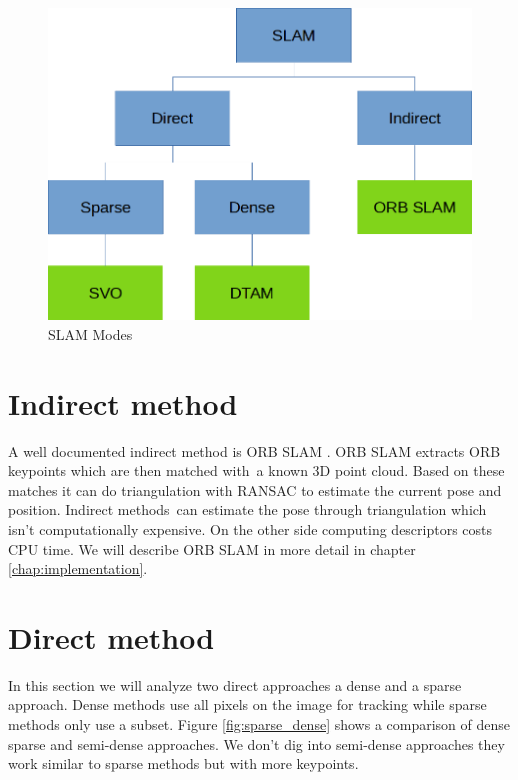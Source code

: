 \documentclass[11pt,a4paper,titlepage,oneside]{report}
\begin{document}
\begin{figure}[H]
	\includegraphics[width=1.0\textwidth]{img/slam_modes.png}
	\caption{SLAM Modes}\label{fig:slammodes}
\end{figure}


\section{Indirect method}

A well documented indirect method is ORB SLAM \cite{orbslam}. ORB SLAM extracts ORB keypoints which are then matched with a known 3D point cloud. Based on these matches it can do triangulation with RANSAC \cite{ransac} to estimate the current pose and position. Indirect methods can estimate the pose through triangulation which isn’t computationally expensive. On the other side computing descriptors costs CPU time. We will describe ORB SLAM in more detail in chapter \ref{chap:implementation}.

\section{Direct method}

In this section we will analyze two direct approaches a dense and a sparse approach. Dense methods use all pixels on the image for tracking while sparse methods only use a subset. Figure \ref{fig:sparse_dense} shows a comparison of dense sparse and semi-dense approaches. We don't dig into semi-dense approaches they work similar to sparse methods but with more keypoints.
\end{document}
